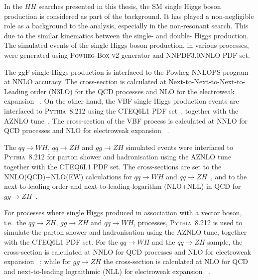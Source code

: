 In the $HH$ searches presented in this thesis, 
the SM single Higgs boson production 
is considered as part of the background.
It has played a non-negligible role as a background 
to the analysis, especially in the non-resonant search.
This due to the similar kinematics between the 
single- and double- Higgs production.
The simulated events of the single Higgs boson production, 
in various processes, were generated using 
\textsc{Powheg-Box v2} generator and NNPDF3.0NNLO PDF set.


The ggF single Higgs production is interfaced to the 
Powheg NNLOPS program~\cite{Hamilton:2013fea,Hamilton:2015nsa}
at NNLO accuracy. 
The cross-section is calculated at Next-to-Next-to-Next-to-Leading
order (N3LO) for the QCD processes and NLO for the electroweak expansion
~\cite{deFlorian:2016spz,Anastasiou:2016cez,Anastasiou:2015ema,Dulat:2018rbf,Actis:2008ug}.
On the other hand, 
the VBF single Higgs production events are 
interfaced to \textsc{Pythia~8.212} using the 
\textsc{CTEQ6L1} PDF set~\cite{CTEQ6L1},
together with the AZNLO tune~\cite{AZNLOtune}.
The cross-section of the VBF process is 
calculated at NNLO for QCD processes and 
NLO for electroweak expansion
~\cite{deFlorian:2016spz,Ciccolini:2007jr,Ciccolini:2007ec,Bolzoni:2010xr}.


The $qq \rightarrow WH$, $qq \rightarrow ZH$ and $gg \rightarrow ZH$ simulated events
were interfaced to \textsc{Pythia~8.212} for parton shower
and hadronisation using the AZNLO tune together with the
\textsc{CTEQ6L1} PDF set.
The cross-sections are set to the NNLO(QCD)+NLO(EW) calculations for
$qq \rightarrow WH$ and 
$qq \rightarrow ZH$~\cite{Ciccolini:2003jy,Brein:2003wg,Ferrera:2011bk,Brein:2011vx,Ferrera:2013yga,Ferrera:2014lca,Campbell:2016jau},
and to the next-to-leading order and next-to-leading-logarithm (NLO+NLL) in QCD for
$gg \rightarrow ZH$~\cite{Altenkamp:2012sx,Hespel:2015zea,ggzhnll,Harlander:2013mla,Brein:2012ne}.


For processes where single Higgs produced in association with a vector boson, 
i.e.\ the $qq \rightarrow ZH$, $gg \rightarrow ZH$ and $qq \rightarrow WH$, 
processes, \textsc{Pythia~8.212} is used to simulate the parton shower
and hadronisation using the AZNLO tune, together with the 
\textsc{CTEQ6L1} PDF set.
For the $qq \rightarrow WH$ and the $qq \rightarrow ZH$ sample, 
the cross-section is calculated at NNLO for QCD processes and 
NLO for electroweak expansion
~\cite{Ciccolini:2003jy,Brein:2003wg,Ferrera:2011bk,Brein:2011vx,
Ferrera:2013yga,Ferrera:2014lca,Campbell:2016jau}; 
while for $gg \rightarrow ZH$ the cross-section is calculated 
at NLO for QCD and next-to-leading lograithmic (NLL) for electroweak expansion
~\cite{Altenkamp:2012sx,Hespel:2015zea,ggzhnll,Harlander:2013mla,Brein:2012ne}. 

